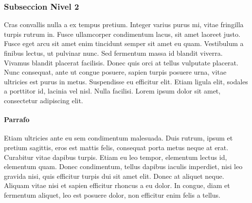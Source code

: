 \subsubsection{Subseccion Nivel 2}

Cras convallis nulla a ex tempus pretium. Integer varius purus mi, vitae fringilla turpis rutrum in. Fusce ullamcorper 
condimentum lacus, sit amet laoreet justo. Fusce eget arcu sit amet enim tincidunt semper sit amet eu quam. Vestibulum a 
finibus lectus, ut pulvinar nunc. Sed fermentum massa id blandit viverra. Vivamus blandit placerat facilisis. Donec quis 
orci at tellus vulputate placerat. Nunc consequat, ante ut congue posuere, sapien turpis posuere urna, vitae ultricies est 
purus in metus. Suspendisse eu efficitur elit. Etiam ligula elit, sodales a porttitor id, lacinia vel nisl. Nulla facilisi. 
Lorem ipsum dolor sit amet, consectetur adipiscing elit. 

\paragraph{Parrafo}

Etiam ultricies ante eu sem condimentum malesuada. Duis rutrum, ipsum et pretium sagittis, eros est mattis felis, consequat 
porta metus neque at erat. Curabitur vitae dapibus turpis. Etiam eu leo tempor, elementum lectus id, elementum quam. Donec 
condimentum, tellus dapibus iaculis imperdiet, nisi leo gravida nisi, quis efficitur turpis dui sit amet elit. Donec at aliquet 
neque. Aliquam vitae nisi et sapien efficitur rhoncus a eu dolor. In congue, diam et fermentum aliquet, leo est posuere dolor, 
non efficitur enim felis a tellus. 